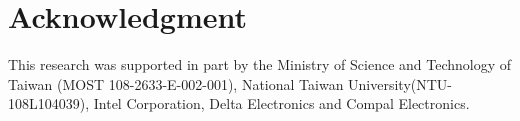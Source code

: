 \documentclass{bmvc2k}
\begin{document}
\section*{Acknowledgment}
This research was supported in part by the Ministry of Science and Technology of Taiwan (MOST 108-2633-E-002-001), National Taiwan University(NTU-108L104039), Intel Corporation, Delta Electronics and Compal Electronics. 
\end{document}
